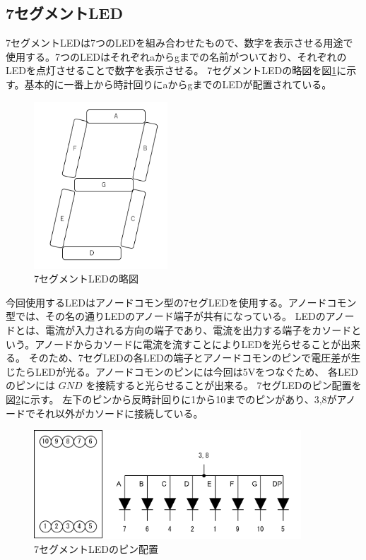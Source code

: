 \documentclass[a4paper,11pt,dvipdfmx]{jsarticle}
\begin{document}
\subsection{7セグメントLED}
7セグメントLEDは7つのLEDを組み合わせたもので、数字を表示させる用途で使用する。7つのLEDはそれぞれaからgまでの名前がついており、それぞれのLEDを点灯させることで数字を表示させる。
7セグメントLEDの略図を図\ref{fig:7seg}に示す。基本的に一番上から時計回りにaからgまでのLEDが配置されている。
\begin{figure}[h]
  \centering
  \includegraphics[width=5cm]{./images/7seg.png}
  \caption{7セグメントLEDの略図}
  \label{fig:7seg}
\end{figure}
今回使用するLEDはアノードコモン型の7セグLEDを使用する。アノードコモン型では、その名の通りLEDのアノード端子が共有になっている。
LEDのアノードとは、電流が入力される方向の端子であり、電流を出力する端子をカソードという。アノードからカソードに電流を流すことによりLEDを光らせることが出来る。
そのため、7セグLEDの各LEDの端子とアノードコモンのピンで電圧差が生じたらLEDが光る。アノードコモンのピンには今回は5Vをつなぐため、
各LEDのピンには $GND$ を接続すると光らせることが出来る。
7セグLEDのピン配置を図\ref{fig:7segpin}に示す。
左下のピンから反時計回りに1から10までのピンがあり、3,8がアノードでそれ以外がカソードに接続している。
\begin{figure}[h]
  \centering
  \includegraphics[width=10cm]{./images/7segpin.png}
  \caption{7セグメントLEDのピン配置}
  \label{fig:7segpin}
\end{figure}
\end{document}

